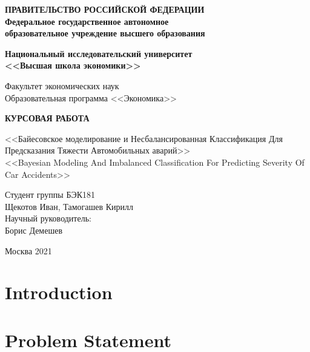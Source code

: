 \documentclass[a4paper,10pt]{extarticle}
\begin{document}
\thispagestyle{empty}
\begin{center}
	\textbf{ПРАВИТЕЛЬСТВО РОССИЙСКОЙ ФЕДЕРАЦИИ}\\
	\vspace{3ex}
	\textbf{Федеральное государственное автономное\\ образовательное учреждение высшего образования}

	\vspace{3ex}

	\textbf{Национальный исследовательский университет \\ <<Высшая школа экономики>>}

	\vspace{10ex}
	\begin{flushright}
		Факультет экономических наук\\
		Образовательная программа <<Экономика>>
		\end{flushright}
\end{center}
\vspace{12ex}

\begin{center}
	{\textbf{КУРСОВАЯ РАБОТА
	}}
	\vspace{1ex}

	<<Байесовское моделирование и Несбалансированная Классификация Для Предсказания Тяжести Автомобильных аварий>> \\
	<<Bayesian Modeling And Imbalanced Classification For Predicting Severity Of Car Accidents>>
\end{center}
\vspace{4ex}
\begin{flushright}
	\noindent
	Студент группы БЭК181\\Щекотов Иван, Тамогашев Кирилл\\
	\vspace{13ex}
	Научный руководитель:\\
	Борис Демешев

\end{flushright}

\vfill

\begin{center}
	Москва 2021

\end{center}
\newpage
\tableofcontents
\newpage
\section{Introduction}

\section{Problem Statement}

\end{document}
